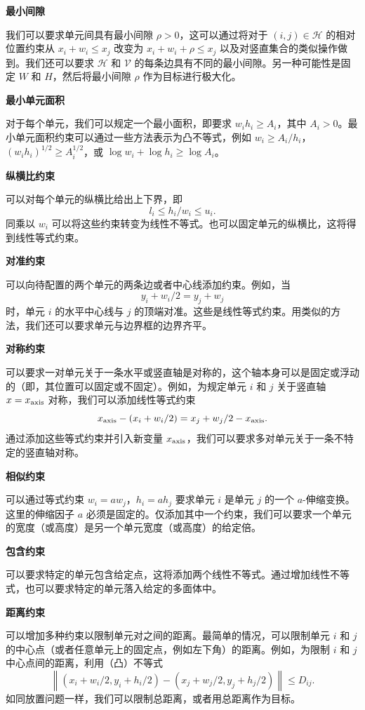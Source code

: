 \documentclass[UTF8, 12pt, fontset=fandol, oneside]{ctexart}
\begin{document}
\noindent\textbf{最小间隙}

我们可以要求单元间具有最小间隙 $\rho>0$，这可以通过将对于 $(i,j)\in\mathcal H$ 的相对位置约束从 $x_i+w_i\leq x_j$ 改变为 $x_i+w_i+\rho\leq x_j$ 以及对竖直集合的类似操作做到。我们还可以要求 $\mathcal H$ 和 $\mathcal V$ 的每条边具有不同的最小间隙。另一种可能性是固定 $W$ 和 $H$，然后将最小间隙 $\rho$ 作为目标进行极大化。

\noindent\textbf{最小单元面积}

对于每个单元，我们可以规定一个最小面积，即要求 $w_ih_i\geq A_i$，其中 $A_i>0$。最小单元面积约束可以通过一些方法表示为凸不等式，例如 $w_i\geq A_i/h_i$，$(w_ih_i)^{1/2}\geq A_i^{1/2}$，或 $\log w_i+\log h_i\geq \log A_i$。

\noindent\textbf{纵横比约束}

可以对每个单元的纵横比给出上下界，即
\[
l_i\leq h_i/w_i\leq u_i.
\]
同乘以 $w_i$ 可以将这些约束转变为线性不等式。也可以固定单元的纵横比，这将得到线性等式约束。

\noindent\textbf{对准约束}

可以向待配置的两个单元的两条边或者中心线添加约束。例如，当
\[
y_i+w_i/2=y_j+w_j
\]
时，单元 $i$ 的水平中心线与 $j$ 的顶端对准。这些是线性等式约束。用类似的方法，我们还可以要求单元与边界框的边界齐平。

\noindent\textbf{对称约束}

可以要求一对单元关于一条水平或竖直轴是对称的，这个轴本身可以是固定或浮动的（即，其位置可以固定或不固定）。例如，为规定单元 $i$ 和 $j$ 关于竖直轴 $x=x_{\rm axis}$ 对称，我们可以添加线性等式约束
\[
x_{\rm axis}-(x_i+w_i/2)=x_j+w_j/2-x_{\rm axis}.
\]
通过添加这些等式约束并引入新变量 $x_{\rm axis}$，我们可以要求多对单元关于一条不特定的竖直轴对称。

\noindent\textbf{相似约束}

可以通过等式约束 $w_i=aw_j$，$h_i=ah_j$ 要求单元 $i$ 是单元 $j$ 的一个 $a$-伸缩变换。这里的伸缩因子 $a$ 必须是固定的。仅添加其中一个约束，我们可以要求一个单元的宽度（或高度）是另一个单元宽度（或高度）的给定倍。

\noindent\textbf{包含约束}

可以要求特定的单元包含给定点，这将添加两个线性不等式。通过增加线性不等式，也可以要求特定的单元落入给定的多面体中。

\noindent\textbf{距离约束}

可以增加多种约束以限制单元对之间的距离。最简单的情况，可以限制单元 $i$ 和 $j$ 的中心点（或者任意单元上的固定点，例如左下角）的距离。例如，为限制 $i$ 和 $j$ 中心点间的距离，利用（凸）不等式
\[
\left\|(x_i+w_i/2,y_i+h_i/2)-(x_j+w_j/2,y_j+h_j/2)\right\|\leq D_{ij}.
\]
如同放置问题一样，我们可以限制总距离，或者用总距离作为目标。
\end{document}

